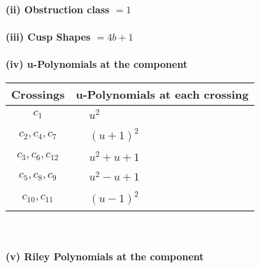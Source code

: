 \documentclass[1p]{elsarticle_modified}
\theoremstyle{definition}
\begin{document}
\flushleft \textbf{(ii) Obstruction class $= 1$}\\~\\
\flushleft \textbf{(iii) Cusp Shapes $= 4 b+1$}\\~\\
\newpage\renewcommand{\arraystretch}{1}
\flushleft \textbf{(iv) u-Polynomials at the component}\newline \\
\begin{tabular}{m{50pt}|m{274pt}}
Crossings & \hspace{64pt}u-Polynomials at each crossing \\
\hline $$\begin{aligned}c_{1}\end{aligned}$$&$\begin{aligned}
&u^2
\end{aligned}$\\
\hline $$\begin{aligned}c_{2},c_{4},c_{7}\end{aligned}$$&$\begin{aligned}
&(u+1)^2
\end{aligned}$\\
\hline $$\begin{aligned}c_{3},c_{6},c_{12}\end{aligned}$$&$\begin{aligned}
&u^2+u+1
\end{aligned}$\\
\hline $$\begin{aligned}c_{5},c_{8},c_{9}\end{aligned}$$&$\begin{aligned}
&u^2- u+1
\end{aligned}$\\
\hline $$\begin{aligned}c_{10},c_{11}\end{aligned}$$&$\begin{aligned}
&(u-1)^2
\end{aligned}$\\
\hline
\end{tabular}\\~\\
\newpage\renewcommand{\arraystretch}{1}
\flushleft \textbf{(v) Riley Polynomials at the component}\newline \\
\end{document}
